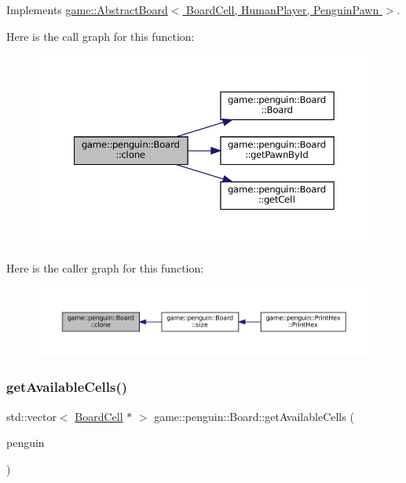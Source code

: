Implements \hyperlink{classgame_1_1_abstract_board_abd467b64fd2c0dfbc0ce87200afb3e9e}{game\+::\+Abstract\+Board$<$ Board\+Cell, Human\+Player, Penguin\+Pawn $>$}.

Here is the call graph for this function\+:
\nopagebreak
\begin{figure}[H]
\begin{center}
\leavevmode
\includegraphics[width=350pt]{classgame_1_1penguin_1_1_board_acad4a3c7bee2103aea4586356ceabb8e_cgraph}
\end{center}
\end{figure}
Here is the caller graph for this function\+:
\nopagebreak
\begin{figure}[H]
\begin{center}
\leavevmode
\includegraphics[width=350pt]{classgame_1_1penguin_1_1_board_acad4a3c7bee2103aea4586356ceabb8e_icgraph}
\end{center}
\end{figure}
\mbox{\label{classgame_1_1penguin_1_1_board_a26bc6f1c2da1197d9b68f9b4c4e3126b}} 
\subsubsection{\texorpdfstring{get\+Available\+Cells()}{getAvailableCells()}}
{\footnotesize\ttfamily std\+::vector$<$ \hyperlink{classgame_1_1penguin_1_1_board_cell}{Board\+Cell} $\ast$ $>$ game\+::penguin\+::\+Board\+::get\+Available\+Cells (\begin{DoxyParamCaption}\item[{\hyperlink{classgame_1_1penguin_1_1_penguin_pawn}{Penguin\+Pawn} $\ast$}]{penguin }\end{DoxyParamCaption})\hspace{0.3cm}{\ttfamily [override]}}



